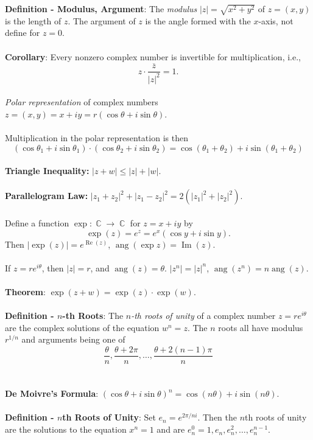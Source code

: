 \documentclass{article}
\DeclareMathOperator{\C}{\mathbb{C}}
\DeclareMathOperator{\re}{Re}
\DeclareMathOperator{\im}{Im}
\DeclareMathOperator{\ang}{ang}
\begin{document}
\textbf{Definition - Modulus, Argument}: The \textit{modulus} $|z| = \sqrt{x^2 + y^2}$ of $z = (x, y)$ is the length of $z$. The argument of $z$ is the angle formed with the $x$-axis, not define for $z = 0$. \\ \\
\textbf{Corollary}: Every nonzero complex number is invertible for multiplication, i.e., $$z \cdot \frac{\overline{z}}{|z|^2} = 1.$$ \\
\textit{Polar representation} of complex numbers $z = (x, y) = x + iy = r(\cos{\theta} + i\sin{\theta})$. \\ \\
Multiplication in the polar representation is then $$(\cos{\theta_1} + i\sin{\theta_1}) \cdot (\cos{\theta_2} + i\sin{\theta_2}) = \cos(\theta_1 + \theta_2) + i\sin(\theta_1 + \theta_2)$$ \\
\textbf{Triangle Inequality:} $|z + w| \leq |z| + |w|$. \\ \\
\textbf{Parallelogram Law:} $|z_1 + z_2|^2 + |z_1 - z_2|^2 = 2(|z_1|^2 + |z_2|^2)$. \\ \\
Define a function $\exp: \C \rightarrow \C$ for $z = x + iy$ by $$\exp(z) = e^z = e^x(\cos{y} + i \sin y).$$ Then $|\exp(z)| = e^{\re(z)}$, $\ang(\exp z) = \im(z)$. \\ \\
If $z = re^{i \theta}$, then $|z| = r$, and $\ang(z) = \theta$. $|z^n| = |z|^n$, $\ang(z^n) = n \ang(z)$.  \\ \\
\textbf{Theorem}: $\exp(z + w) = \exp(z) \cdot \exp(w)$. \\ \\
\textbf{Definition - $n$-th Roots}: The \textit{$n$-th roots of unity} of a complex number $z = re^{i\theta}$ are the complex solutions of the equation $w^n = z.$ The $n$ roots all have modulus $r^{1/n}$ and arguments being one of $$\frac{\theta}{n}, \frac{\theta + 2\pi}{n}, \dots, \frac{\theta + 2(n - 1)\pi}{n}$$ \\ \\
\textbf{De Moivre's Formula}: $(\cos\theta + i \sin\theta)^n = \cos(n\theta) + i \sin(n\theta)$. \\ \\
\textbf{Definition - $n$th Roots of Unity}: Set $e_n = e^{2\pi/ni}$. Then the $n$th roots of unity are the solutions to the equation $x^n = 1$ and are $e_n^0 = 1, e_n, e_n^2, \dots, e_n^{n - 1}$. \\ \\
\end{document}
